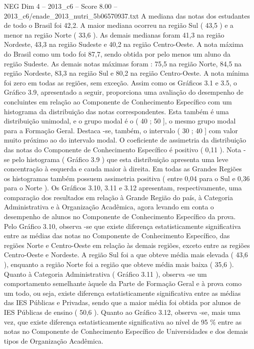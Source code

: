 \begin{textsample}{NEG Dim 4 – 2013\_c6 – Score 8.00 – 2013\_c6/enade\_2013\_nutri\_5b06570937.txt}
A mediana das notas dos estudantes de todo o Brasil foi 42,2.
A maior mediana ocorreu na região Sul ( 43,5 ) e a menor na região Norte ( 33,6 ).
As demais medianas foram 41,3 na região Nordeste, 43,3 na região Sudeste e 40,2 na região Centro-Oeste.
A nota máxima do Brasil como um todo foi 87,7, sendo obtida por pelo menos um aluno da região Sudeste.
As demais notas máximas foram : 75,5 na região Norte, 84,5 na região Nordeste, 83,3 na região Sul e 80,2 na região Centro-Oeste.
A nota mínima foi zero em todas as regiões, sem exceção.
Assim como os Gráficos 3.1 e 3.5, o Gráfico 3.9, apresentado a seguir, proporciona uma avaliação do desempenho de concluintes em relação ao Componente de Conhecimento Específico com um histograma da distribuição das notas correspondentes.
Esta também é uma distribuição unimodal, e o grupo modal é o ( 40 ; 50 ], o mesmo grupo modal para a Formação Geral.
Destaca -se, também, o intervalo ( 30 ; 40 ] com valor muito próximo ao do intervalo modal.
O coeficiente de assimetria da distribuição das notas do Componente de Conhecimento Específico é positivo ( 0,11 ).
Nota -se pelo histograma ( Gráfico 3.9 ) que esta distribuição apresenta uma leve concentração à esquerda e cauda maior à direita.
Em todas as Grandes Regiões os histogramas também possuem assimetria positiva ( entre 0,04 para o Sul e 0,36 para o Norte ).
Os Gráficos 3.10, 3.11 e 3.12 apresentam, respectivamente, uma comparação dos resultados em relação à Grande Região do país, à Categoria Administrativa e à Organização Acadêmica, agora levando em conta o desempenho de alunos no Componente de Conhecimento Específico da prova.
Pelo Gráfico 3.10, observa -se que existe diferença estatisticamente significativa entre as médias das notas no Componente de Conhecimento Específico, das regiões Norte e Centro-Oeste em relação às demais regiões, exceto entre as regiões Centro-Oeste e Nordeste.
A região Sul foi a que obteve média mais elevada ( 43,6 ), enquanto a região Norte foi a região que obteve média mais baixa ( 35,6 ).
Quanto à Categoria Administrativa ( Gráfico 3.11 ), observa -se um comportamento semelhante àquele da Parte de Formação Geral e à prova como um todo, ou seja, existe diferença estatisticamente significativa entre as médias das IES Públicas e Privadas, sendo que a maior média foi obtida por alunos de IES Públicas de ensino ( 50,6 ).
Quanto ao Gráfico 3.12, observa -se, mais uma vez, que existe diferença estatisticamente significativa ao nível de 95 \% entre as notas no Componente de Conhecimento Específico de Universidades e dos demais tipos de Organização Acadêmica.

\end{textsample}
